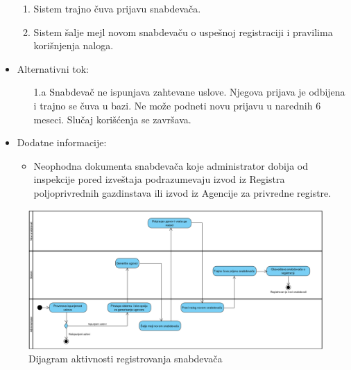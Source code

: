 \begin{itemize}
\begin{enumerate}
		    \item Sistem trajno čuva prijavu snabdevača.
		    \item Sistem šalje mejl novom snabdevaču o uspešnoj registraciji i pravilima korišnjenja naloga.
		\end{enumerate}
	\item Alternativni tok:
		\begin{itemize}
			 \item[1.a] Snabdevač ne ispunjava zahtevane uslove. Njegova prijava je odbijena i trajno se čuva u bazi. Ne može podneti novu prijavu u narednih 6 meseci. Slučaj korišćenja se završava.
	
		\end{itemize}
	\item Dodatne informacije:
		\begin{itemize}
			\item Neophodna dokumenta snabdevača koje administrator dobija od inspekcije pored izveštaja podrazumevaju izvod iz Registra poljoprivrednih gazdinstava ili izvod iz Agencije za privredne registre.
		\end{itemize}						
\end{itemize}

\begin{figure}[H]
\begin{center}
\includegraphics[width=\textwidth]{Pictures/activity_supplier_registration.png}
\end{center}
    \caption{Dijagram aktivnosti registrovanja snabdevača}
\label{fig:ActivitySupplierRegistration}
\end{figure}